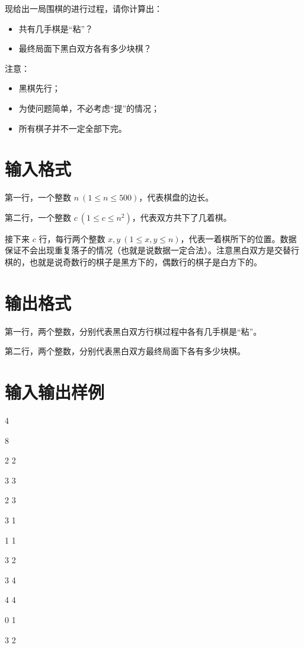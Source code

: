 \documentclass{ctpro}
\begin{document}
现给出一局围棋的进行过程，请你计算出：

\begin{itemize}
	\item 共有几手棋是“粘”？
	\item 最终局面下黑白双方各有多少块棋？
\end{itemize}

注意：

\begin{itemize}
	\item 黑棋先行；
	\item 为使问题简单，不必考虑“提”的情况；
	\item 所有棋子并不一定全部下完。
\end{itemize}

\section*{输入格式}
第一行，一个整数 $n~(1 \leq n \leq 500)$，代表棋盘的边长。

第二行，一个整数 $c~(1 \leq c \leq n^2)$，代表双方共下了几着棋。

接下来 $c$ 行，每行两个整数 $x,y~(1 \leq x,y \leq n)$，代表一着棋所下的位置。数据保证不会出现重复落子的情况（也就是说数据一定合法）。注意黑白双方是交替行棋的，也就是说奇数行的棋子是黑方下的，偶数行的棋子是白方下的。

\section*{输出格式}
第一行，两个整数，分别代表黑白双方行棋过程中各有几手棋是“粘”。

第二行，两个整数，分别代表黑白双方最终局面下各有多少块棋。

\section*{输入输出样例}
\testcasetab
{
	4\par
	8\par
	2 2\par
	3 3\par
	2 3\par
	3 1\par
	1 1\par
	3 2\par
	3 4\par
	4 4
}
{
	0 1\par
	3 2
}
\end{document}
